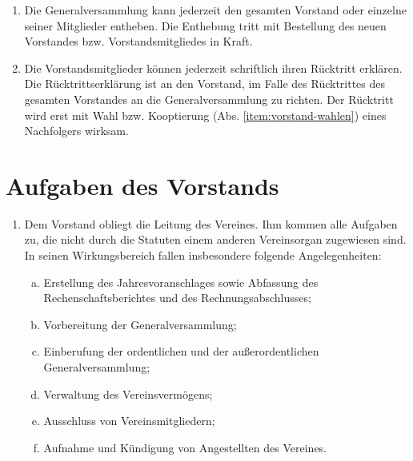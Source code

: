 \documentclass[a4paper,12pt]{article}
\begin{document}
\begin{enumerate}
\item\label{item:vorstand-enthebung} Die Generalversammlung kann jederzeit den gesamten Vorstand oder einzelne seiner Mitglieder entheben. Die Enthebung tritt mit Bestellung des neuen Vorstandes bzw. Vorstandsmitgliedes in Kraft.
\item\label{item:vorstand-rücktritt} Die Vorstandsmitglieder können jederzeit schriftlich ihren Rücktritt erklären. Die Rücktrittserklärung ist an den Vorstand, im Falle des Rücktrittes des gesamten Vorstandes an die Generalversammlung zu richten. Der Rücktritt wird erst mit Wahl bzw. Kooptierung (Abs. \ref{item:vorstand-wahlen}) eines Nachfolgers wirksam.
\end{enumerate}



\section{Aufgaben des Vorstands} %
\label{sec:Vorstand-Aufgaben}
\begin{enumerate}
\item Dem Vorstand obliegt die Leitung des Vereines. Ihm kommen alle Aufgaben zu, die nicht durch die Statuten einem anderen Vereinsorgan zugewiesen sind. In seinen Wirkungsbereich fallen insbesondere folgende Angelegenheiten:
 \begin{enumerate}[(a)]
 \item Erstellung des Jahresvoranschlages sowie Abfassung des Rechenschaftsberichtes und des Rechnungsabschlusses;
 \item Vorbereitung der Generalversammlung;
 \item Einberufung der ordentlichen und der außerordentlichen Generalversammlung;
 \item Verwaltung des Vereinsvermögens;
 \item Ausschluss von Vereinsmitgliedern;
 \item Aufnahme und Kündigung von Angestellten des Vereines.
 \end{enumerate}
\end{enumerate}
\end{document}
